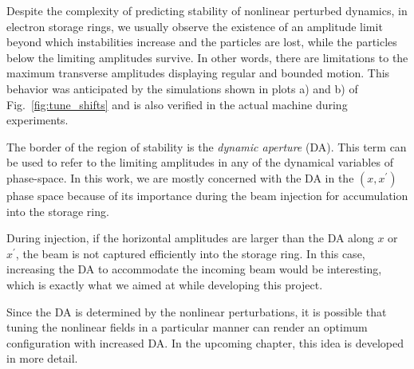    Despite the complexity of predicting stability of nonlinear perturbed dynamics, in electron storage rings, we usually observe the existence of an amplitude limit beyond which instabilities increase and the particles are lost, while the particles below the limiting amplitudes survive. In other words, there are limitations to the maximum transverse amplitudes displaying regular and bounded motion. This behavior was anticipated by the simulations shown in plots a) and b) of Fig.~\ref{fig:tune_shifts} and is also verified in the actual machine during experiments.

The border of the region of stability is the \textit{dynamic aperture} (\acrshort*{DA}). This term can be used to refer to the limiting amplitudes in any of the dynamical variables of phase-space. In this work, we are mostly concerned with the \gls*{DA} in the $(x, x^\prime)$ phase space because of its importance during the beam injection for accumulation into the storage ring.

During injection, if the horizontal amplitudes are larger than the \gls*{DA} along $x$ or $x^\prime$, the beam is not captured efficiently into the storage ring. In this case, increasing the \gls*{DA} to accommodate the incoming beam would be interesting, which is exactly what we aimed at while developing this project.

Since the \gls*{DA} is determined by the nonlinear perturbations, it is possible that tuning the nonlinear fields in a particular manner can render an optimum configuration with increased \gls*{DA}.  In the upcoming chapter, this idea is developed in more detail.
